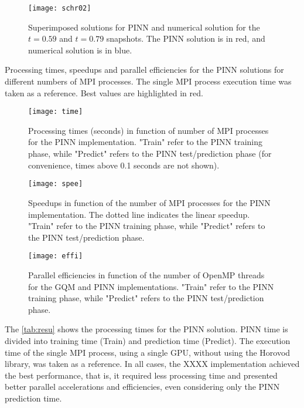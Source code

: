 \documentclass[conference]{IEEEtran}
\begin{document}
\begin{figure}[htb]
\centering
\texttt{[image: schr02]}
\caption{Superimposed solutions for PINN and numerical solution for the $t=0.59$ and $t=0.79$ snapshots. The PINN solution is in red, and numerical solution is in blue.}
\label{fig:schr2}
\end{figure}

\begin{table}[htb]
\centering
\caption{Processing times, speedups and parallel efficiencies for the PINN  solutions for different numbers of MPI processes. The single MPI process execution time was taken as a reference. Best values are highlighted in red.}
\label{tab:resu}
\end{table}

\begin{figure}[htb]
\centering
\texttt{[image: time]}
\caption{Processing times (seconds) in function of number of MPI processes for the PINN implementation. "Train" refer to the PINN training phase, while "Predict" refers to the PINN test/prediction phase (for convenience, times above 0.1 seconds are not shown).}
\label{fig:time}
\end{figure}

\begin{figure}[htb]
\centering
\texttt{[image: spee]}
\caption{Speedups in function of the number of MPI processes for the PINN implementation. The dotted line indicates the linear speedup. "Train" refer to the PINN training phase, while "Predict" refers to the PINN test/prediction phase.}
\label{fig:spee}
\end{figure}

\begin{figure}[htb]
\centering
\texttt{[image: effi]}
\caption{Parallel efficiencies in function of the number of OpenMP threads for the GQM and PINN implementations. "Train" refer to the PINN training phase, while "Predict" refers to the PINN test/prediction phase.}
\label{fig:effi}
\end{figure}

The \autoref{tab:resu} shows the processing times for the PINN solution. PINN time is divided into training time (Train) and prediction time (Predict). The execution time of the single MPI process, using a single GPU, without using the Horovod library, was taken as a reference. In all cases, the XXXX implementation achieved the best performance, that is, it required less processing time and presented better parallel accelerations and efficiencies, even considering only the PINN prediction time.
\end{document}
